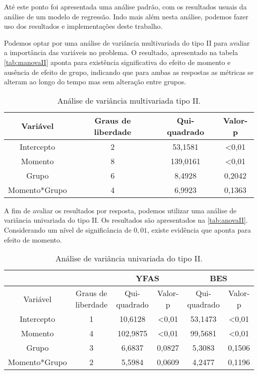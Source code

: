 Até este ponto foi apresentada uma análise padrão, com os resultados usuais da análise de um modelo de regressão. Indo mais além nesta análise, podemos fazer uso dos resultados e implementações deste trabalho.

Podemos optar por uma análise de variância multivariada do tipo II para avaliar a importância das variáveis no problema. O resultado, apresentado na tabela \autoref{tab:manovaII} aponta para existência significativa do efeito de momento e ausência de efeito de grupo, indicando que para ambas as respostas as métricas se alteram ao longo do tempo mas sem alteração entre grupos.

\begin{table}[H]
\centering
\begin{tabular}{cccc}
\hline
Variável      & Graus de liberdade & Qui-quadrado & Valor-p        \\ \hline
Intercepto    & 2                  & 53,1581      & \textless 0,01 \\
Momento       & 8                  & 139,0161     & \textless 0,01 \\
Grupo         & 6                  & 8,4928       & 0,2042         \\
Momento*Grupo & 4                  & 6,9923       & 0,1363         \\ \hline
\end{tabular}
\caption{Análise de variância multivariada tipo II.}
\label{tab:manovaII}
\end{table}

A fim de avaliar os resultados por resposta, podemos utilizar uma análise de variância univariada do tipo II. Os resultados são apresentados na \autoref{tab:anovaII}. Considerando um nível de significância de $0,01$, existe evidência que aponta para efeito de momento.

\begin{table}[H]
\centering
\begin{tabular}{c|c|cc|cc}
\hline
              &                    & \multicolumn{2}{c|}{YFAS}     & \multicolumn{2}{c}{BES}       \\ \hline
Variável      & Graus de liberdade & Qui-quadrado & Valor-p        & Qui-quadrado & Valor-p        \\ \hline
Intercepto    & 1                  & 10,6128      & \textless 0,01 & 53,1473      & \textless 0,01 \\
Momento       & 4                  & 102,9875     & \textless 0,01 & 99,5681      & \textless 0,01 \\
Grupo         & 3                  & 6,6837       & 0,0827         & 5,3083       & 0,1506         \\
Momento*Grupo & 2                  & 5,5984       & 0,0609         & 4,2477       & 0,1196         \\ \hline
\end{tabular}
\caption{Análise de variância univariada do tipo II.}
\label{tab:anovaII}
\end{table}

